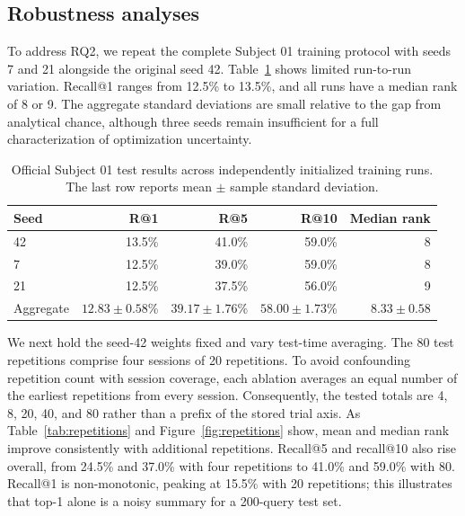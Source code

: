 \documentclass[10pt]{article}
\begin{document}
\subsection{Robustness analyses}

To address RQ2, we repeat the complete Subject 01 training protocol with seeds
7 and 21 alongside the original seed 42. Table~\ref{tab:seeds} shows limited
run-to-run variation. Recall@1 ranges from 12.5\% to 13.5\%, and all runs have
a median rank of 8 or 9. The aggregate standard deviations are small relative
to the gap from analytical chance, although three seeds remain insufficient
for a full characterization of optimization uncertainty.

\begin{table}[t]
  \centering
  \caption{Official Subject 01 test results across independently initialized
  training runs. The last row reports mean $\pm$ sample standard deviation.}
  \label{tab:seeds}
  \begin{tabular}{lrrrr}
    \toprule
    Seed & R@1 & R@5 & R@10 & Median rank\\
    \midrule
    42 & 13.5\% & 41.0\% & 59.0\% & 8\\
    7  & 12.5\% & 39.0\% & 59.0\% & 8\\
    21 & 12.5\% & 37.5\% & 56.0\% & 9\\
    \midrule
    Aggregate & $12.83\pm0.58$\% & $39.17\pm1.76$\% &
    $58.00\pm1.73$\% & $8.33\pm0.58$\\
    \bottomrule
  \end{tabular}
\end{table}

We next hold the seed-42 weights fixed and vary test-time averaging. The 80
test repetitions comprise four sessions of 20 repetitions. To avoid
confounding repetition count with session coverage, each ablation averages an
equal number of the earliest repetitions from every session. Consequently,
the tested totals are 4, 8, 20, 40, and 80 rather than a prefix of the stored
trial axis. As Table~\ref{tab:repetitions} and
Figure~\ref{fig:repetitions} show, mean and median rank improve consistently
with additional repetitions. Recall@5 and recall@10 also rise overall, from
24.5\% and 37.0\% with four repetitions to 41.0\% and 59.0\% with 80.
Recall@1 is non-monotonic, peaking at 15.5\% with 20 repetitions; this
illustrates that top-1 alone is a noisy summary for a 200-query test set.
\end{document}
